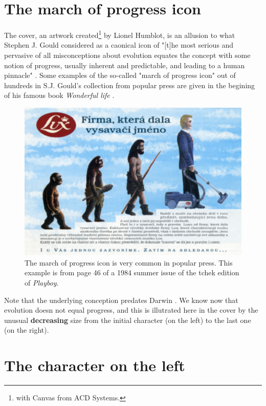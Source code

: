 \documentclass[a4paper]{article}
\begin{document}
\section{The march of progress icon}

The cover, an artwork created\footnote{
with Canvas from  ACD Systems.}
by Lionel Humblot, is an allusion to what
Stephen J. Gould considered as a caonical icon of "[t]he most serious 
and pervasive of all misconceptions about evolution equates the 
concept with some notion of progress, usually inherent and predictable, 
and leading to a human pinnacle" \cite{GouldSJ1995}. Some examples
of the so-called "march of progress icon" out of hundreds in S.J. 
Gould's collection from popular press are given in the begining of his 
famous book \textit{Wonderful life} \cite{GouldSJ1989}.

\begin{figure}
\includegraphics[width=\textwidth]{../figs/mop}
\caption{The march of progress icon is very common in popular press. This
example is from page 46 of a 1984 summer issue of the tchek edition 
of \textit{Playboy}.}
\label{mop}
\end{figure}

Note that the underlying conception predates Darwin \cite{LovejoyAO1936}.
We know now that evolution doesn not equal progress, and this is illutrated
here in the cover by the unusual \textbf{decreasing} size from the initial 
character (on the left) to the last one (on the right).

\section{The character on the left}
\end{document}
